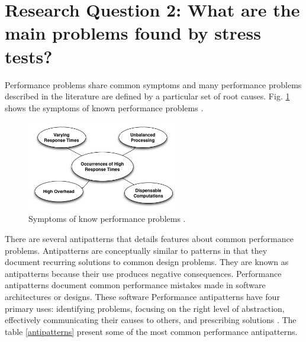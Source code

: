 \documentclass{report}
\begin{document}
\section{Research Question 2: What are the main problems found by stress tests?}

 Performance problems share common symptoms and many performance problems described in the literature are defined by a particular set of root causes. Fig. \ref{fig:symptoms}  shows the symptoms of known performance problems \cite{Wert2013a}. 



\begin{figure}[h]
\centering
\includegraphics[width=0.6\textwidth]{./images/symptoms.png}
\caption{Symptoms of know performance problems \cite{Wert2013a}. }
\label{fig:symptoms}
\end{figure}


There are several antipatterns that details features about  common performance problems. Antipatterns are conceptually similar to patterns in that they document recurring solutions to common design problems. They are known as
antipatterns because their use produces negative consequences.  Performance antipatterns document common performance mistakes made in software architectures or designs. These software Performance antipatterns have four primary uses: identifying problems,
focusing on the
right level of abstraction,
effectively communicating
their causes to others, and prescribing solutions \cite{brown1998antipatterns}. The table \ref{antipatterns} present some of the most common performance antipatterns.
\end{document}

